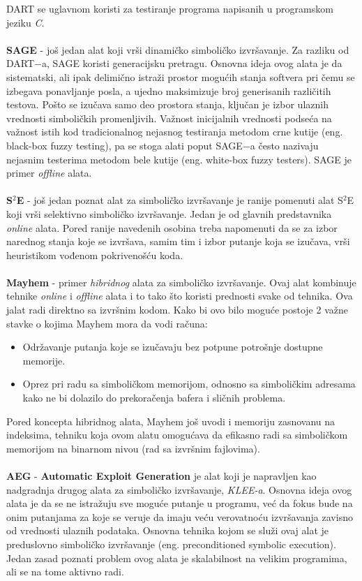\documentclass[12pt]{article}
\begin{document}
DART se uglavnom koristi za testiranje programa napisanih u programskom jeziku \textit{C}. \\
\\
\textbf{SAGE} - još jedan alat koji vrši dinamičko simboličko izvršavanje. Za razliku od DART$-$a, SAGE koristi generacijsku pretragu. Osnovna ideja ovog alata je da sistematski, ali ipak delimično istraži prostor mogućih stanja softvera pri čemu se izbegava ponavljanje posla, a ujedno maksimizuje broj generisanih različitih testova. Pošto se izučava samo deo prostora stanja, ključan je izbor ulaznih vrednosti simboličkih promenljivih. Važnost inicijalnih vrednosti podseća na važnost istih kod tradicionalnog nejasnog testiranja metodom crne kutije (eng. black-box fuzzy testing), pa se stoga alati poput SAGE$-$a često nazivaju nejasnim testerima metodom bele kutije (eng. white-box fuzzy testers). SAGE je primer \textit{offline} alata. \\
\\
\textbf{S$^2$E} - još jedan poznat alat za simboličko izvršavanje je ranije pomenuti alat S$^2$E koji vrši selektivno simboličko izvršavanje. Jedan je od glavnih predstavnika \textit{online} alata. Pored ranije navedenih osobina treba napomenuti da se za izbor narednog stanja koje se izvršava, samim tim i izbor putanje koja se izučava, vrši heuristikom vođenom pokrivenošću koda. \\
\\
\textbf{Mayhem} - primer \textit{hibridnog} alata za simboličko izvršavanje. Ovaj alat kombinuje tehnike \textit{online} i \textit{offline} alata i to tako što koristi prednosti svake od tehnika. Ova jalat radi direktno sa izvršnim kodom. Kako bi ovo bilo moguće postoje 2 važne stavke o kojima Mayhem mora da vodi računa:
\begin{itemize}
    \item Održavanje putanja koje se izučavaju bez potpune potrošnje dostupne memorije.
    
    \item Oprez pri radu sa simboličkom memorijom, odnosno sa simboličkim adresama kako ne bi dolazilo do prekoračenja bafera i sličnih problema.
\end{itemize} 
\medskip
Pored koncepta hibridnog alata, Mayhem još uvodi i memoriju zasnovanu na indeksima, tehniku koja ovom alatu omogućava da efikasno radi sa simboličkom memorijom na binarnom nivou (rad sa izvršnim fajlovima).\\
\\
\textbf{AEG} - \textbf{Automatic Exploit Generation} je alat koji je napravljen kao nadgradnja drugog alata za simboličko izvršavanje, \textit{KLEE-a}. Osnovna ideja ovog alata je da se ne istražuju sve moguće putanje u programu, već da fokus bude na onim putanjama za koje se veruje da imaju veću verovatnoću izvršavanja zavisno od vrednosti ulaznih podataka. Osnovna tehnika kojom se služi ovaj alat je preduslovno simboličko izvršavanje (eng. preconditioned symbolic execution). Jedan zasad poznati problem ovog alata je skalabilnost na velikim programima, ali se na tome aktivno radi.
\newpage
\end{document}
